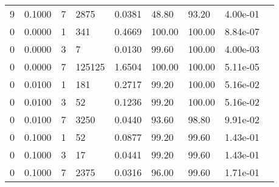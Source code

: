 \begin{longtable}{@{}lllllllll@{}}
9           & 0.1000 & 7   & 2875   & 0.0381 & 48.80   & 93.20   & 4.00e-01  &  \\
0           & 0.0000 & 1   & 341    & 0.4669 & 100.00  & 100.00  & 8.84e-07  &  \\
0           & 0.0000 & 3   & 7      & 0.0130 & 99.60   & 100.00  & 4.00e-03  &  \\
0           & 0.0000 & 7   & 125125 & 1.6504 & 100.00  & 100.00  & 5.11e-05  &  \\
0           & 0.0100 & 1   & 181    & 0.2717 & 99.20   & 100.00  & 5.16e-02  &  \\
0           & 0.0100 & 3   & 52     & 0.1236 & 99.20   & 100.00  & 5.16e-02  &  \\
0           & 0.0100 & 7   & 3250   & 0.0440 & 93.60   & 98.80   & 9.91e-02  &  \\
0           & 0.1000 & 1   & 52     & 0.0877 & 99.20   & 99.60   & 1.43e-01  &  \\
0           & 0.1000 & 3   & 17     & 0.0441 & 99.20   & 99.60   & 1.43e-01  &  \\
0           & 0.1000 & 7   & 2375   & 0.0316 & 96.00   & 99.60   & 1.71e-01  &  \\* \bottomrule
\end{longtable}
